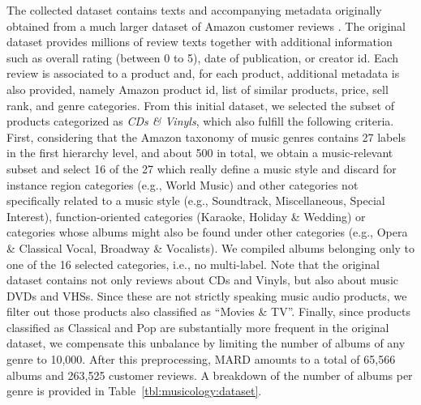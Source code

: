 The collected dataset contains texts and accompanying metadata originally obtained from a much larger dataset of Amazon customer reviews \citep{McAuley2015a,mcauley2015image}. The original dataset provides millions of review texts together with additional information such as overall rating (between 0 to 5), date of publication, or creator id. Each review is associated to a product and, for each product, additional metadata is also provided, namely Amazon product id, list of similar products, price, sell rank, and genre categories. From this initial dataset, we selected the subset of products categorized as \textit{CDs \& Vinyls}, which also fulfill the following criteria. First, considering that the Amazon taxonomy of music genres contains 27 labels in the first hierarchy level, and about 500 in total, we obtain a music-relevant subset and select 16 of the 27 which really define a music style and discard for instance region categories (e.g., World Music) and other categories not specifically related to a music style (e.g., Soundtrack, Miscellaneous, Special Interest), function-oriented categories (Karaoke, Holiday \& Wedding) or categories whose albums might also be found under other categories (e.g., Opera \& Classical Vocal, Broadway \& Vocalists). We compiled albums belonging only to one of the 16 selected categories, i.e., no multi-label. Note that the original dataset contains not only reviews about CDs and Vinyls, but also about music DVDs and VHSs. Since these are not strictly speaking music audio products, we filter out those products also classified as ``Movies \& TV''. Finally, since products classified as Classical and Pop are substantially more frequent in the original dataset, we compensate this unbalance by limiting the number of albums of any genre to 10,000. After this preprocessing, MARD amounts to a total of 65,566 albums and 263,525 customer reviews. A breakdown of the number of albums per genre is provided in Table~\ref{tbl:musicology:dataset}.

